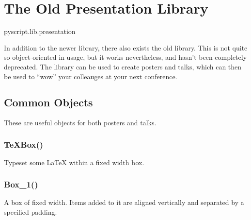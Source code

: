 % 
%
%


\chapter{The Old Presentation Library}

\begin{python}
pyscript.lib.presentation
\end{python}

In addition to the newer  library, there also
exists the old  library.  This is not quite
so object-oriented in usage, but it works nevertheless, and hasn't been
completely deprecated.  The  library can be used to create
posters and talks, which can then be used to ``wow'' your colleauges at your
next conference.

\section{Common Objects}

These are useful objects for both posters and talks.

\subsection{TeXBox()}

Typeset some \LaTeX{} within a fixed width box.

\subsection{Box\_1()}

A box of fixed width.  Items added to it are aligned vertically and
separated by a specified padding.

